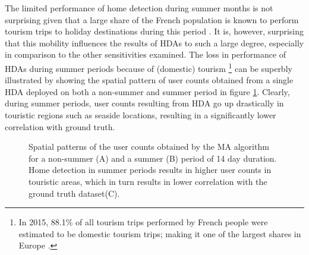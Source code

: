 \documentclass[a4paper]{article}
\begin{document}
The limited performance of home detection during summer months is not surprising given that a large share of the French population is known to perform tourism trips to holiday destinations during this period \cite{Deville2014,Vanhoof_domestictourism,Vanhoof_JOS}. It is, however, surprising that this mobility influences the results of HDAs to such a large degree, especially in comparison to the other sensitivities examined. The loss in performance of HDAs during summer periods because of (domestic) tourism \footnote{In 2015, 88.1\% of all tourism trips performed by French people were estimated to be domestic tourism trips; making it one of the largest shares in Europe \cite{Vanhoof_domestictourism}.} can be superbly illustrated by showing the spatial pattern of user counts obtained from a single HDA deployed on both a non-summer and summer period in figure \ref{fig:one_hda_two_maps}. Clearly, during summer periods, user counts resulting from HDA go up drastically in touristic regions such as seaside locations, resulting in a significantly lower correlation with ground truth. 

\begin{figure}[htpb!]
\centering
\caption{Spatial patterns of the user counts obtained by the MA algorithm for a non-summer (A) and a summer (B) period of 14 day duration. Home detection in summer periods results in higher user counts in touristic areas, which in turn results in lower correlation with the ground truth dataset(C).}
\label{fig:one_hda_two_maps}
\end{figure}
\end{document}
